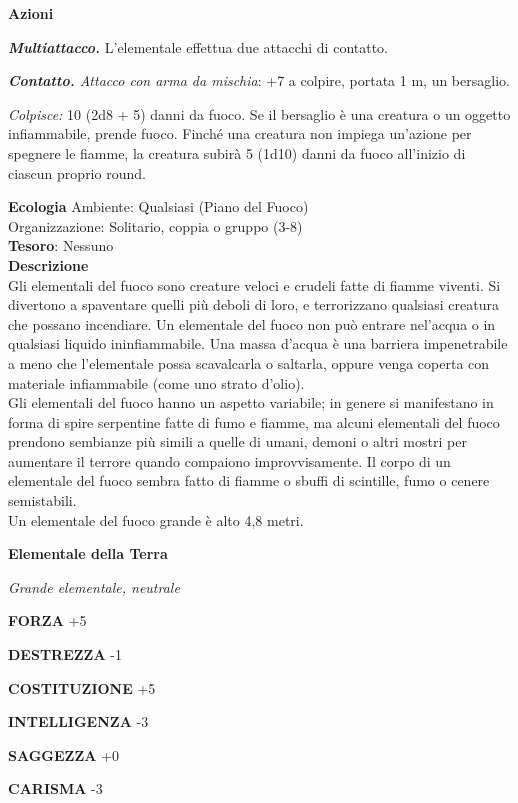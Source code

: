 \begin{multicols}{2}
	\textbf{Azioni}

	\textit{\textbf{Multiattacco.}} L'elementale effettua due attacchi di contatto.

	\textit{\textbf{Contatto.} Attacco con arma da mischia}: +7 a colpire, portata 1 m, un bersaglio.

	\textit{Colpisce:} 10 (2d8 + 5) danni da fuoco. Se il bersaglio è una creatura o un oggetto infiammabile, prende fuoco. Finché una creatura non impiega un'azione per spegnere le fiamme, la creatura subirà 5 (1d10) danni da fuoco all'inizio di ciascun proprio round.

	\textbf{Ecologia}
	Ambiente: Qualsiasi (Piano del Fuoco)\\
	Organizzazione: Solitario, coppia o gruppo (3-8)\\
	\textbf{Tesoro}: Nessuno\\
	\textbf{Descrizione}\\
	Gli elementali del fuoco sono creature veloci e crudeli fatte di fiamme viventi. Si divertono a spaventare quelli più deboli di loro, e terrorizzano qualsiasi creatura che possano incendiare. Un elementale del fuoco non può entrare nel'acqua o in qualsiasi liquido ininfiammabile. Una massa d'acqua è una barriera impenetrabile a meno che l'elementale possa scavalcarla o saltarla, oppure venga coperta con materiale infiammabile (come uno strato d'olio).\\
	Gli elementali del fuoco hanno un aspetto variabile; in genere si manifestano in forma di spire serpentine fatte di fumo e fiamme, ma alcuni elementali del fuoco prendono sembianze più simili a quelle di umani, demoni o altri mostri per aumentare il terrore quando compaiono improvvisamente. Il corpo di un elementale del fuoco sembra fatto di fiamme o sbuffi di scintille, fumo o cenere semistabili.\\

	Un elementale del fuoco grande è alto 4,8 metri.

	\medskip{}\textbf{Elementale della Terra}

	\textit{Grande elementale, neutrale}

	\textbf{FORZA} +5

	\textbf{DESTREZZA} -1

	\textbf{COSTITUZIONE} +5

	\textbf{INTELLIGENZA} -3

	\textbf{SAGGEZZA} +0

	\textbf{CARISMA} -3


\end{multicols}
